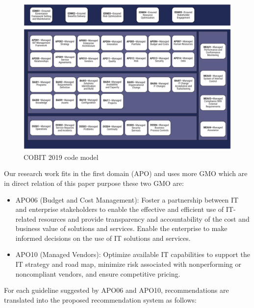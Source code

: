 \documentclass[preprint,3p,onecolumn]{elsarticle}
\begin{document}
\begin{figure}[H]
\centering
\includegraphics[scale=.5]{cobit}
\caption{COBIT 2019 code model}
\label{cobit}
\end{figure}

\par Our research work fits in the first domain (APO) and uses more GMO which are in direct relation of this paper purpose these two GMO are:

\begin{itemize}
\item APO06 (Budget and Cost Management): Foster a partnership between IT and enterprise stakeholders to enable the effective and efficient use of IT-related resources and provide transparency and accountability of the cost and business value of solutions and services. Enable the enterprise to make informed decisions on the use of IT solutions and services.
\item APO10 (Managed Vendors): Optimize available IT capabilities to support the IT strategy and road map, minimize risk associated with nonperforming or noncompliant vendors, and ensure competitive pricing.
\end{itemize}

\par For each guideline suggested by APO06 and APO10, recommendations are translated into the proposed recommendation system as follows:
\end{document}
